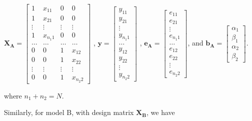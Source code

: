 \documentclass[11pt, oneside]{article}   	%
\begin{document}
\bigskip

\( \mathbf{X_A} =  \left[ \begin{array}{cccc}
1   &  x_{11}   & 0   & 0  \\
1   &  x_{21}   & 0  &  0  \\
\vdots &  \vdots  & \vdots  &  \vdots  \\
1   &  x_{n_{1}1} &  0  & 0  \\
\ldots  & \ldots  & \ldots  & \ldots  \\
0   &   0   &  1   & x_{12}  \\
0   &   0   &  1  & x_{22}   \\
\vdots &  \vdots  & \vdots  &  \vdots  \\
0   &   0   &  1   & x_{n_{2}2}
\end{array} \right] \) ,
\( \mathbf{y} = \left[ \begin{array}{c}
y_{11} \\
y_{21} \\
\vdots  \\
y_{n_{1}1}  \\
\ldots \\
y_{12} \\
y_{22}  \\
\vdots  \\
y_{n_{2}2}
\end{array} \right] \) ,
\( \mathbf{e_{A}} = \left[ \begin{array}{c}
e_{11} \\
e_{21} \\
\vdots  \\
e_{n_{1}1}  \\
\ldots \\
e_{12} \\
e_{22}  \\
\vdots  \\
e_{n_{2}2}
\end{array} \right] \),
\mbox{and}
\( \mathbf{b_{A}} = \left[ \begin{array}{c}
\alpha_{1} \\
\beta_{1}  \\
\alpha_{2}  \\
\beta_{2}
\end{array} \right] \).

\bigskip
\noindent where $ n_{1} + n_{2} = N $. 


\bigskip

\noindent Similarly, for model B, with design matrix $ \mathbf{X_{B}} $, we have
\bigskip
\end{document}
